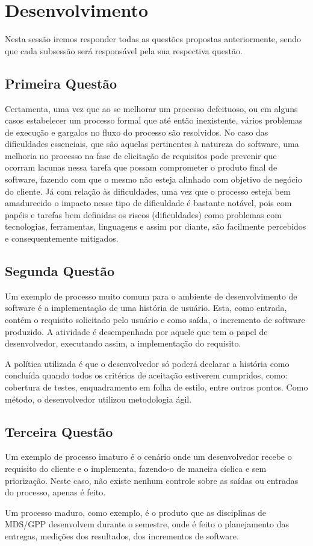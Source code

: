 \chapter[Desenvolvimento ]{Desenvolvimento}

Nesta sessão iremos responder todas as questões propostas anteriormente, sendo
que cada subsessão será responsável pela sua respectiva questão.

\section{Primeira Questão}
\label{sec:Primeira Questão}

Certamenta, uma vez que ao se melhorar um processo defeituoso, ou em alguns casos estabelecer um processo formal que até então inexistente, vários problemas
de execução e gargalos no fluxo do processo são resolvidos. No caso das dificuldades essenciais, que são aquelas pertinentes à natureza do software, uma
melhoria no processo na fase de elicitação de requisitos pode prevenir que ocorram lacunas nessa tarefa que possam comprometer o produto final de software,
fazendo com que o mesmo não esteja alinhado com objetivo de negócio do cliente. Já com relação às dificuldades, uma vez que o processo esteja bem amadurecido
o impacto nesse tipo de dificuldade é bastante notável, pois com papéis e tarefas bem definidas os riscos (dificuldades) como problemas com tecnologias, ferramentas,
linguagens e assim por diante, são facilmente percebidos e consequentemente mitigados.

\section{Segunda Questão}
\label{sec:Segunda Questão}

Um exemplo de processo muito comum para o ambiente de desenvolvimento de software
é a implementação de uma história de usuário. Esta, como entrada, contém o
requisito solicitado pelo usuário e como saída, o incremento de software produzido.
A atividade é desempenhada por aquele que tem o papel de desenvolvedor, executando
assim, a implementação do requisito.

A política utilizada é que o desenvolvedor só poderá declarar a história como
concluída quando todos os critérios de aceitação estiverem cumpridos, como:
cobertura de testes, enquadramento em folha de estilo, entre outros pontos. Como
método, o desenvolvedor utilizou metodologia ágil.

\section{Terceira Questão}
\label{sec:Terceira Questão}

Um exemplo de processo imaturo é o cenário onde um desenvolvedor recebe o requisito
do cliente e o implementa, fazendo-o de maneira cíclica e sem priorização.
Neste caso, não existe nenhum controle sobre as saídas ou entradas do processo,
apenas é feito.

Um processo maduro, como exemplo, é o produto que as disciplinas de MDS/GPP
desenvolvem durante o semestre, onde é feito o planejamento das entregas, medições
dos resultados, dos incrementos de software.
